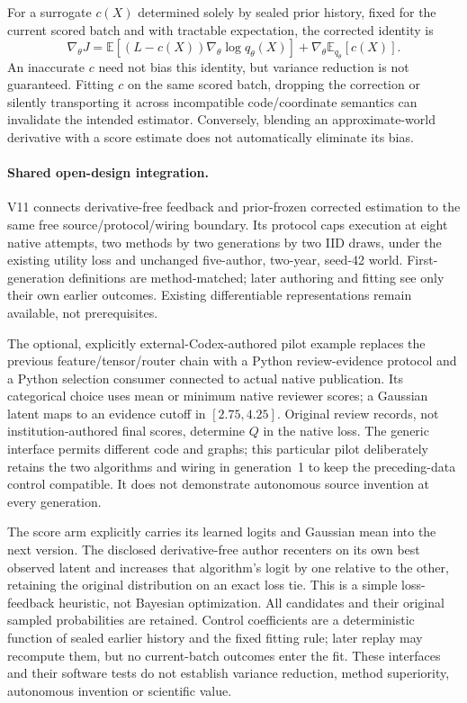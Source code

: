 For a surrogate $c(X)$ determined solely by sealed prior history, fixed for the
current scored batch and with tractable expectation, the corrected identity is
\begin{equation}
 \nabla_\theta J
 =\mathbb E\!\left[(L-c(X))\nabla_\theta\log q_\theta(X)\right]
   +\nabla_\theta\mathbb E_{q_\theta}[c(X)].
 \label{eq:native-v11-control-variate}
\end{equation}
An inaccurate $c$ need not bias this identity, but variance reduction is not
guaranteed. Fitting $c$ on the same scored batch, dropping the correction or
silently transporting it across incompatible code/coordinate semantics can
invalidate the intended estimator. Conversely, blending an approximate-world
derivative with a score estimate does not automatically eliminate its bias.

\paragraph{Shared open-design integration.}
V11 connects derivative-free feedback and prior-frozen corrected estimation
to the same free source/protocol/wiring boundary. Its protocol caps execution
at eight native attempts, two methods by two generations by two IID draws,
under the existing utility loss and unchanged five-author, two-year, seed-42
world. First-generation definitions are method-matched; later authoring and
fitting see only their own earlier outcomes. Existing differentiable
representations remain available, not prerequisites.

The optional, explicitly external-Codex-authored pilot example replaces the
previous feature/tensor/router chain with a Python review-evidence protocol
and a Python selection consumer connected to actual native publication. Its
categorical choice uses mean or minimum native reviewer scores; a Gaussian
latent maps to an evidence cutoff in $[2.75,4.25]$. Original review records,
not institution-authored final scores, determine $Q$ in the native loss.
The generic interface permits different code and graphs; this particular
pilot deliberately retains the two algorithms and wiring in generation~1
to keep the preceding-data control compatible. It does not demonstrate
autonomous source invention at every generation.

The score arm explicitly carries its learned logits and Gaussian mean into
the next version. The disclosed derivative-free author recenters on its own
best observed latent and increases that algorithm's logit by one relative to
the other, retaining the original distribution on an exact loss tie. This is
a simple loss-feedback heuristic, not Bayesian optimization. All candidates
and their original sampled probabilities are retained. Control coefficients
are a deterministic function of sealed earlier history and the fixed fitting
rule; later replay may recompute them, but no current-batch outcomes enter the
fit. These interfaces and their software tests do not establish variance
reduction, method superiority, autonomous invention or scientific value.

